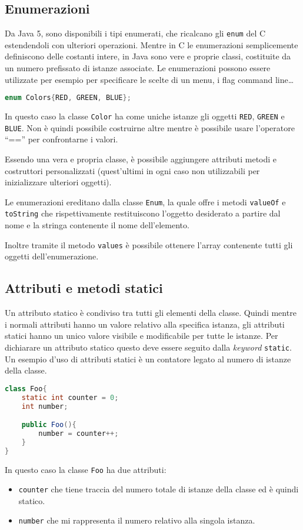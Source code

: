 \documentclass{article}
\begin{document}
\subsection{Enumerazioni}

Da Java 5, sono disponibili i tipi enumerati, che
ricalcano gli \texttt{enum} del C estendendoli con
ulteriori operazioni.
Mentre in C le enumerazioni semplicemente definiscono delle
costanti intere, in Java sono vere e proprie classi,
costituite da un numero prefissato di istanze associate. Le enumerazioni possono essere utilizzate per esempio per specificare le scelte di un menu, i flag command line\ldots
\begin{lstlisting}[language=Java,escapechar=|]
enum Colors{RED, GREEN, BLUE};
\end{lstlisting}  
In questo caso la classe \texttt{Color}
ha come uniche istanze gli oggetti \texttt{RED},
\texttt{GREEN} e \texttt{BLUE}.
Non è quindi possibile costruirne altre mentre è possibile
usare l'operatore ``=='' per confrontarne i valori.

Essendo una vera e propria classe, è possibile aggiungere
attributi metodi e
costruttori personalizzati (quest'ultimi in ogni caso non utilizzabili per inizializzare ulteriori oggetti).

Le enumerazioni ereditano dalla classe \texttt{Enum},
la quale offre i metodi \texttt{valueOf} e \texttt{toString}
che rispettivamente restituiscono l'oggetto desiderato
a partire dal nome e la stringa contenente il nome dell'elemento.

Inoltre tramite il metodo \texttt{values} è possibile ottenere
l'array contenente tutti gli oggetti dell'enumerazione.

\subsection{Attributi e metodi statici}

Un attributo statico è condiviso tra tutti gli elementi della classe.
Quindi mentre i normali attributi hanno un valore relativo
alla specifica istanza, gli attributi statici hanno un unico
valore visibile e modificabile per tutte le istanze.
Per dichiarare un attributo statico questo deve essere seguito
dalla \textit{keyword} \texttt{static}.
Un esempio d'uso di attributi statici
è un contatore legato al numero di istanze della classe. 
\begin{lstlisting}[language=Java,escapechar=|]
class Foo{
    static int counter = 0;
    int number;

    public Foo(){
	    number = counter++;
    }
}
\end{lstlisting} 
In questo caso la classe \texttt{Foo} ha due attributi:
\begin{itemize}
	\item \texttt{counter} che tiene traccia del numero totale
		di istanze della classe ed è quindi statico.
	\item \texttt{number} che mi rappresenta il numero relativo 
		alla singola istanza.
\end{itemize}
\end{document}
